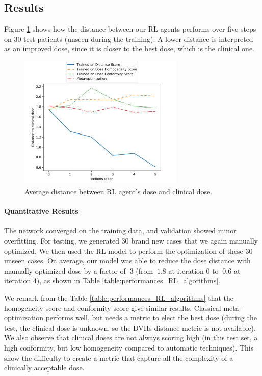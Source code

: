 \subsection{Results}
Figure \ref{fig:distance} shows how the distance between our RL agents performs over five steps on 30 test patients (unseen during the training).
A lower distance is interpreted as an improved dose, since it is closer to the best dose, which is the clinical one.
\begin{figure}
	\centering
	\includegraphics[width=0.7\textwidth]{AIME/DistanceToClinicalDose.pdf}
	\caption{Average distance between RL agent's dose and clinical dose.}
	\label{fig:distance}
\end{figure}

\paragraph{Quantitative Results}
The network converged on the training data, and validation showed minor overfitting.
For testing, we generated 30 brand new cases that we again manually optimized.
We then used the RL model to perform the optimization of these 30 unseen cases.
On average, our model was able to reduce the dose distance with manually optimized dose by a factor of $~3$ (from $~1.8$ at iteration $0$ to $~0.6$ at iteration $4$), as shown in Table \ref{table:performances_RL_algorithms}.

We remark from the Table \ref{table:performances_RL_algorithms} that the homogeneity score and conformity score give similar results.
Classical meta-optimization performs well, but needs a metric to elect the best dose (during the test, the clinical dose is unknown, so the DVHs distance metric is not available).
We also observe that clinical doses are not always scoring high (in this test set, a high conformity, but low homogeneity compared to automatic techniques).
This show the difficulty to create a metric that capture all the complexity of a clinically acceptable dose.

